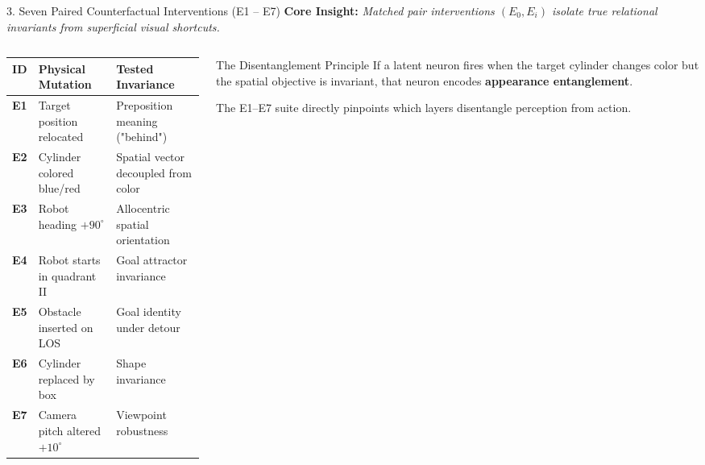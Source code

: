 \documentclass[aspectratio=169, 10pt]{beamer}
\begin{document}
\begin{frame}{3. Seven Paired Counterfactual Interventions (E1 -- E7)}
  \textbf{Core Insight:} \textit{Matched pair interventions $(E_0, E_i)$ isolate true relational invariants from superficial visual shortcuts.}

  \vspace{0.2cm}
  \begin{columns}[T]
    \begin{column}{0.52\textwidth}
      \small
      \begin{tabular}{cll}
        \toprule
        \textbf{ID} & \textbf{Physical Mutation} & \textbf{Tested Invariance} \\
        \midrule
        \textbf{E1} & Target position relocated & Preposition meaning ("behind") \\
        \textbf{E2} & Cylinder colored blue/red & Spatial vector decoupled from color \\
        \textbf{E3} & Robot heading $+90^\circ$ & Allocentric spatial orientation \\
        \textbf{E4} & Robot starts in quadrant II & Goal attractor invariance \\
        \textbf{E5} & Obstacle inserted on LOS & Goal identity under detour \\
        \textbf{E6} & Cylinder replaced by box & Shape invariance \\
        \textbf{E7} & Camera pitch altered $+10^\circ$ & Viewpoint robustness \\
        \bottomrule
      \end{tabular}
    \end{column}

    \begin{column}{0.45\textwidth}
      \begin{alertblock}{The Disentanglement Principle}
        \small
        If a latent neuron fires when the target cylinder changes color but the spatial objective is invariant, that neuron encodes \textbf{appearance entanglement}.
        \vspace{0.15cm}

        The E1--E7 suite directly pinpoints which layers disentangle perception from action.
      \end{alertblock}
    \end{column}
  \end{columns}
\end{frame}
\end{document}
